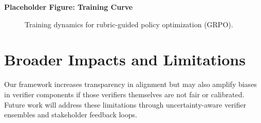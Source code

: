 \documentclass[sigconf]{acmart}
\begin{document}
\textbf{Placeholder Figure: Training Curve}
\begin{figure}[h]
\centering
{}
\caption{Training dynamics for rubric-guided policy optimization (GRPO).}
\label{fig:training-curve}
\end{figure}

\section{Broader Impacts and Limitations}
\label{appendix:impact}
Our framework increases transparency in alignment but may also amplify biases in verifier components if those verifiers themselves are not fair or calibrated. Future work will address these limitations through uncertainty-aware verifier ensembles and stakeholder feedback loops.





\end{document}
